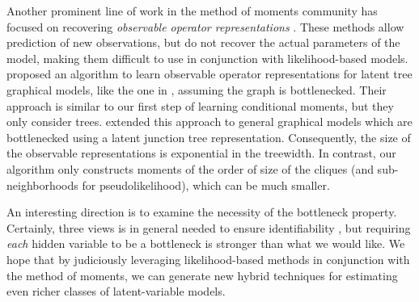 
Another prominent line of work in the method of moments community has
  focused on recovering {\em observable operator
  representations} \citep{jaeger2000observable,hsu09spectral,bailly2010spectral,balle12automata}.
  These methods allow prediction of new observations, but do not
  recover the actual parameters of the model, making them difficult to use
  in conjunction with likelihood-based models. %
\citet{song2011spectral} proposed an algorithm to learn observable
  operator representations for latent tree graphical models, like the
  one in , assuming the graph is bottlenecked. 
Their approach is similar to our first step of learning conditional moments,
  but they only consider trees.
\citet{parikh12spectral} extended this approach to general graphical
  models which are bottlenecked using a latent junction tree representation. 
  Consequently, the size of the observable representations is exponential in
  the treewidth.
  In contrast, our algorithm only constructs moments of the order of size of the cliques
  (and sub-neighborhoods for pseudolikelihood), which can be much smaller.

An interesting direction is to examine the necessity of the bottleneck
property.  Certainly, three views is in general needed to ensure
identifiability \cite{kruskal77three}, but requiring \emph{each} hidden variable to be
a bottleneck is stronger than what we would like.  We hope that by judiciously
leveraging likelihood-based methods in conjunction with the method of moments,
we can generate new hybrid techniques for estimating
even richer classes of latent-variable models.
